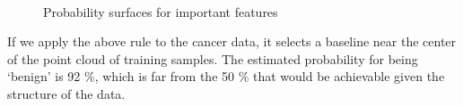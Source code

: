 \begin{figure}
\caption{Probability surfaces for important features}
\label{fig_probability_important}
%
\begin{center}
\\
\end{center}
\end{figure}
%
If we apply the above rule to the cancer data, it selects a baseline near the center of the point cloud of training samples.
The estimated probability for being `benign' is 92 \%, which is far from the 50 \% that would be achievable given the structure of the data.
